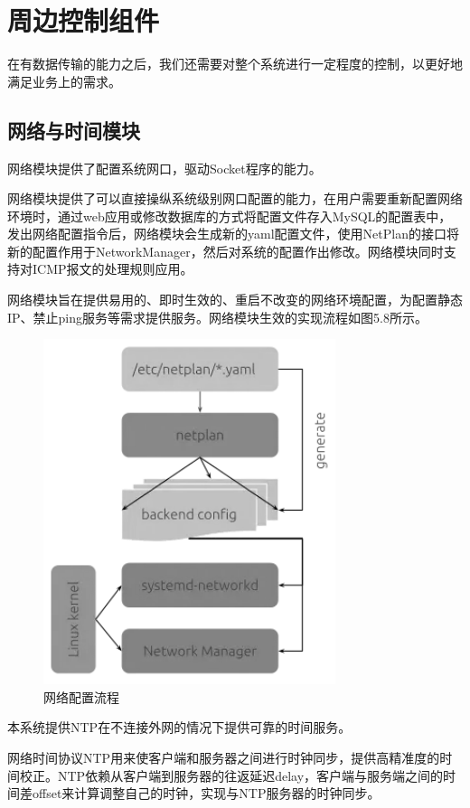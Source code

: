 \section{周边控制组件}

在有数据传输的能力之后，我们还需要对整个系统进行一定程度的控制，以更好地满足业务上的需求。

\subsection{网络与时间模块}

网络模块提供了配置系统网口，驱动Socket程序的能力。

网络模块提供了可以直接操纵系统级别网口配置的能力，在用户需要重新配置网络环境时，通过web应用或修改数据库的方式将配置文件存入MySQL的配置表中，发出网络配置指令后，网络模块会生成新的yaml配置文件，使用NetPlan的接口将新的配置作用于NetworkManager，然后对系统的配置作出修改。网络模块同时支持对ICMP报文的处理规则应用。

网络模块旨在提供易用的、即时生效的、重启不改变的网络环境配置，为配置静态IP、禁止ping服务等需求提供服务。网络模块生效的实现流程如图5.8所示。

\begin{figure}[!htbp]
\centering
\includegraphics[scale=1]{figures/HW/N1.png}
\caption{网络配置流程}
\end{figure}

本系统提供NTP在不连接外网的情况下提供可靠的时间服务。

网络时间协议NTP用来使客户端和服务器之间进行时钟同步，提供高精准度的时间校正。NTP依赖从客户端到服务器的往返延迟delay，客户端与服务端之间的时间差offset来计算调整自己的时钟，实现与NTP服务器的时钟同步。

